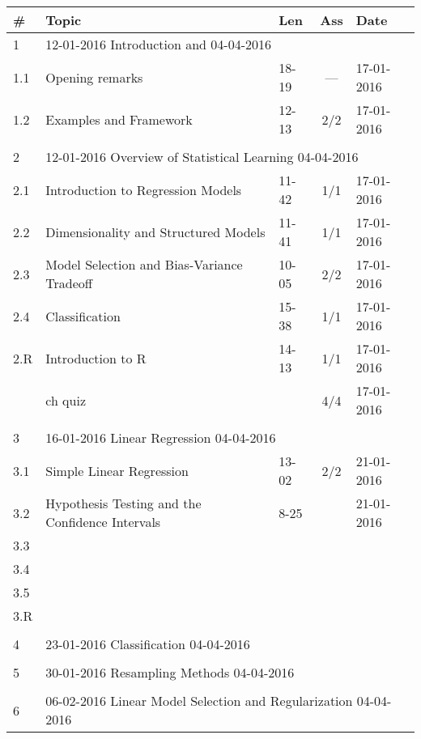 \documentclass[a4paper,12pt]{article} %
\begin{document}
\begin{longtable}{|l|p{11cm}|l|c|l|}
	\hline
	\# & Topic & Len & Ass & Date \\
	\hline
	1 & \multicolumn{4}{|l|}{12-01-2016 \hfill Introduction and  \hfill 04-04-2016}\\
	\hline
	1.1 & Opening remarks & 18-19 & --- & 17-01-2016 \\
	\hline
	1.2 & Examples and Framework & 12-13 & 2/2 & 17-01-2016 \\
	\hline
	& & & &  \\
	\hline
	2 & \multicolumn{4}{|l|}{12-01-2016 \hfill Overview of Statistical Learning \hfill 04-04-2016}\\
	\hline
	2.1 & Introduction to Regression Models & 11-42 & 1/1 & 17-01-2016 \\
	\hline
	2.2 & Dimensionality and Structured Models & 11-41 & 1/1 & 17-01-2016 \\
	\hline
	2.3 & Model Selection and Bias-Variance Tradeoff & 10-05 & 2/2 & 17-01-2016 \\
	\hline
	2.4 & Classification & 15-38 & 1/1 & 17-01-2016 \\
	\hline
	2.R & Introduction to R & 14-13 & 1/1 & 17-01-2016 \\
	\hline
	& ch quiz & & 4/4 & 17-01-2016 \\
	\hline
	& & & &  \\
	\hline
	3 & \multicolumn{4}{|l|}{16-01-2016 \hfill Linear Regression \hfill 04-04-2016}\\
	\hline
	3.1 & Simple Linear Regression & 13-02 & 2/2 & 21-01-2016 \\
	\hline
	3.2 & Hypothesis Testing and the Confidence Intervals & 8-25 & & 21-01-2016 \\
	\hline
	3.3 & & & &  \\
	\hline
	3.4 & & & &  \\
	\hline
	3.5 & & & &  \\
	\hline
	3.R & & & &  \\
	\hline
	& & & &  \\
	\hline
	4 & \multicolumn{4}{|l|}{23-01-2016 \hfill Classification \hfill 04-04-2016}\\
	\hline
	& & & &  \\
	\hline
	5 & \multicolumn{4}{|l|}{30-01-2016 \hfill Resampling Methods \hfill 04-04-2016}\\
	\hline
	& & & &  \\
	\hline
	6 & \multicolumn{4}{|l|}{06-02-2016 \hfill Linear Model Selection and Regularization \hfill 04-04-2016}\\

\end{longtable}
\end{document}
